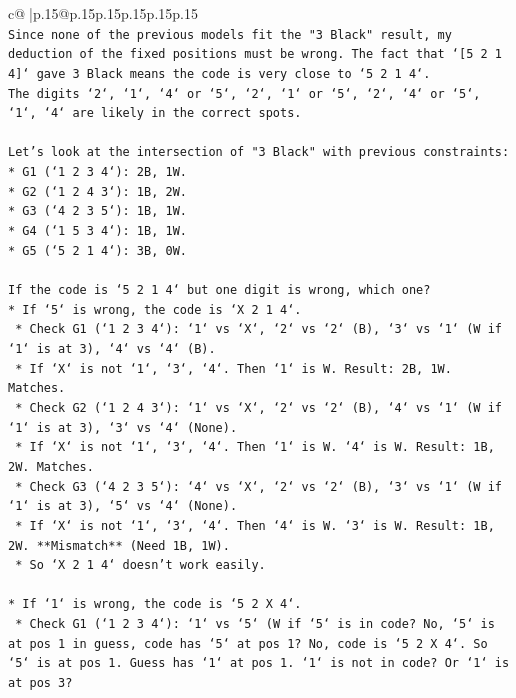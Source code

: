 \documentclass{article}
\begin{document}
{\begin{supertabular}{c@{$\;$}|p{.15\linewidth}@{}p{.15\linewidth}p{.15\linewidth}p{.15\linewidth}p{.15\linewidth}p{.15\linewidth}}
{{{\\ 
\texttt{Since none of the previous models fit the "3 Black" result, my deduction of the fixed positions must be wrong. The fact that `{[}5 2 1 4{]}` gave 3 Black means the code is very close to `5 2 1 4`.} \\
\texttt{The digits `2`, `1`, `4` or `5`, `2`, `1` or `5`, `2`, `4` or `5`, `1`, `4` are likely in the correct spots.} \\
\\ 
\texttt{Let's look at the intersection of "3 Black" with previous constraints:} \\
\texttt{*   G1 (`1 2 3 4`): 2B, 1W.} \\
\texttt{*   G2 (`1 2 4 3`): 1B, 2W.} \\
\texttt{*   G3 (`4 2 3 5`): 1B, 1W.} \\
\texttt{*   G4 (`1 5 3 4`): 1B, 1W.} \\
\texttt{*   G5 (`5 2 1 4`): 3B, 0W.} \\
\\ 
\texttt{If the code is `5 2 1 4` but one digit is wrong, which one?} \\
\texttt{*   If `5` is wrong, the code is `X 2 1 4`.} \\
\texttt{    *   Check G1 (`1 2 3 4`): `1` vs `X`, `2` vs `2` (B), `3` vs `1` (W if `1` is at 3), `4` vs `4` (B).} \\
\texttt{        *   If `X` is not `1`, `3`, `4`. Then `1` is W. Result: 2B, 1W. Matches.} \\
\texttt{    *   Check G2 (`1 2 4 3`): `1` vs `X`, `2` vs `2` (B), `4` vs `1` (W if `1` is at 3), `3` vs `4` (None).} \\
\texttt{        *   If `X` is not `1`, `3`, `4`. Then `1` is W. `4` is W. Result: 1B, 2W. Matches.} \\
\texttt{    *   Check G3 (`4 2 3 5`): `4` vs `X`, `2` vs `2` (B), `3` vs `1` (W if `1` is at 3), `5` vs `4` (None).} \\
\texttt{        *   If `X` is not `1`, `3`, `4`. Then `4` is W. `3` is W. Result: 1B, 2W. **Mismatch** (Need 1B, 1W).} \\
\texttt{    *   So `X 2 1 4` doesn't work easily.} \\
\\ 
\texttt{*   If `1` is wrong, the code is `5 2 X 4`.} \\
\texttt{    *   Check G1 (`1 2 3 4`): `1` vs `5` (W if `5` is in code? No, `5` is at pos 1 in guess, code has `5` at pos 1? No, code is `5 2 X 4`. So `5` is at pos 1. Guess has `1` at pos 1. `1` is not in code? Or `1` is at pos 3?} \\
}}}
\end{supertabular}}
\end{document}
